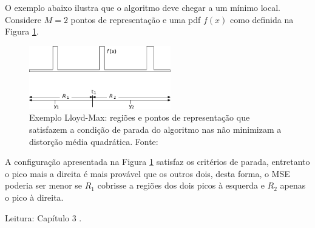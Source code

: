 \begin{frame}[allowframebreaks]
  \framebreak
  O exemplo abaixo ilustra que o algoritmo deve chegar a um mínimo local.
  Considere $M=2$ pontos de representação e uma pdf $f(x)$ como definida na Figura \ref{fig:lloyd-ex}.

  \begin{figure}[h!]
  \centering
  \includegraphics[width=0.55\textwidth]{images/lloyd-ex.pdf}
  \caption{Exemplo Lloyd-Max: regiões e pontos de representação que satisfazem 
        a condição de parada do algoritmo nas não minimizam a distorção média quadrática.
	Fonte: \citet{gallager2008}}
  \label{fig:lloyd-ex}
  \end{figure}

  \framebreak

  A configuração apresentada na Figura \ref{fig:lloyd-ex} satisfaz os critérios de parada, entretanto
  o pico mais a direita é mais provável que os outros dois, desta forma, o MSE poderia ser menor se 
  $R_1$ cobrisse a regiões dos dois picos à esquerda e $R_2$ apenas o pico à direita.

  \vspace{2ex}
  Leitura: Capítulo 3 .
\end{frame}






